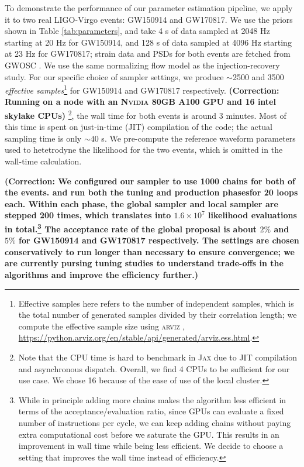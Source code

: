 \documentclass[twocolumn]{aastex631}
\newcommand{\corr}[1]{\textbf{\color{pyRed}(Correction: #1)}}
\begin{document}
To demonstrate the performance of our parameter estimation pipeline, we apply it
to two real LIGO-Virgo events: GW150914 and GW170817. We use the priors shown in
Table \ref{tab:parameters}, and take 4 s of data sampled at 2048 Hz starting at
20 Hz for GW150914, and 128 s of data sampled at 4096 Hz starting at 23 Hz for
GW170817; strain data and PSDs for both events are fetched from GWOSC
\citep{GWOSC}. We use the same normalizing flow model as the injection-recovery
study. For our specific choice of sampler settings, we produce ${\sim}$2500 and
3500 \emph{effective samples}\footnote{Effective samples here refers to the
number of independent samples, which is the total number of generated samples
divided by their correlation length; we compute the effective sample size using
\textsc{arviz} \citep{arviz_2019},
\url{https://python.arviz.org/en/stable/api/generated/arviz.ess.html}. } for
GW150914 and GW170817 respectively. \corr{Running on a node with an
\textsc{Nvidia} 80GB A100 GPU and 16 intel skylake CPUs} \footnote{Note that the
CPU time is hard to benchmark in \textsc{Jax} due to JIT compilation and
asynchronous dispatch. Overall, we find 4 CPUs to be sufficient for our use
case. We chose 16 because of the ease of use of the local cluster.}, the wall
time for both events is around 3 minutes. Most of this time is spent on
just-in-time (JIT) compilation of the code; the actual sampling time is only
${\sim}40$ s. We pre-compute the reference waveform parameters used to
hetetrodyne the likelihood for the two events, which is omitted in the wall-time
calculation.

\corr{We configured our sampler to use
1000 chains for both of the events. and run both the tuning and production phasesfor 
20 loops each. Within each phase, the global sampler and
local sampler are stepped 200 times, which translates into $1.6 \times 10^7$
likelihood evaluations in total.\footnote{While in principle adding more
chains makes the algorithm less efficient in terms of the acceptance/evaluation
ratio, since GPUs can evaluate a fixed number of instructions per cycle, we can
keep adding chains without paying extra computational cost before we saturate
the GPU. This results in an improvement in wall time while being less efficient.
We decide to choose a setting that improves the wall time instead of efficiency.} The
acceptance rate of the global proposal is about $2\%$ and $5\%$ for GW150914 and
GW170817 respectively. The settings are chosen conservatively to run longer than
necessary to ensure convergence; we are currently pursing tuning studies to
understand trade-offs in the algorithms and improve the efficiency further.}
\end{document}
